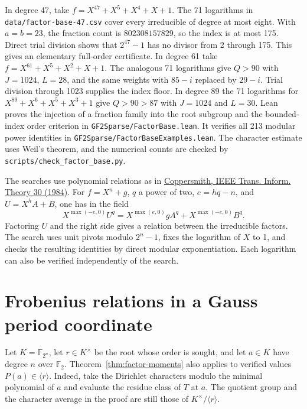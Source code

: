 \documentclass[11pt]{article}
\newcommand{\F}{\mathbb F_2}
\begin{document}
In degree 47, take \(f=X^{47}+X^5+X^4+X+1\).
The 71 logarithms in \nolinkurl{data/factor-base-47.csv} cover every
irreducible of degree at most eight. With \(a=b=23\), the fraction
count is \(802308157829\), so the index is at most 175.
Direct trial division shows that \(2^{47}-1\) has no divisor from 2
through 175. This gives an elementary full-order certificate. In degree
61 take \(f=X^{61}+X^5+X^2+X+1\). The analogous 71 logarithms give
\(Q>90\) with \(J=1024\), \(L=28\), and the same weights with
\(85-i\) replaced by \(29-i\). Trial division through 1023 supplies
the index floor. In degree 89 the 71 logarithms for
\(X^{89}+X^6+X^5+X^3+1\) give \(Q>90>87\) with \(J=1024\)
and \(L=30\). Lean proves the injection of a fraction family into
the root subgroup and the bounded-index order criterion in
\nolinkurl{GF2Sparse/FactorBase.lean}. It verifies all 213 modular
power identities in \nolinkurl{GF2Sparse/FactorBaseExamples.lean}.
The character estimate uses Weil's theorem, and the numerical counts
are checked by
\nolinkurl{scripts/check_factor_base.py}.

The searches use polynomial relations as in
\href{https://research.ibm.com/publications/fast-evaluation-of-logarithms-in-fields-of-characteristic-two}{Coppersmith, IEEE Trans. Inform. Theory 30 (1984)}.
For \(f=X^n+g\), \(q\) a power of two, \(e=hq-n\), and \(U=X^h A+B\),
one has in the field
\[
   X^{\max(-e,0)} U^q=X^{\max(e,0)}g A^q+X^{\max(-e,0)}B^q .
\]
Factoring \(U\) and the right side gives a relation between the
irreducible factors. The search uses unit pivots modulo \(2^n-1\),
fixes the logarithm of \(X\) to 1, and checks the resulting identities
by direct modular exponentiation. Each logarithm can also be verified
independently of the search.


\section{Frobenius relations in a Gauss period coordinate}\label{sec:period-logs}

Let \(K=\mathbb F_{2^n}\), let \(r\in K^\times\) be the root whose
order is sought, and let \(a\in K\) have degree \(n\) over \(\F\).
Theorem~\ref{thm:factor-moments} also applies to verified values
\(P(a)\in\langle r\rangle\). Indeed, take the Dirichlet characters
modulo the minimal polynomial of \(a\) and evaluate the residue class
of \(T\) at \(a\). The quotient group and the character average in the
proof are still those of \(K^\times/\langle r\rangle\).
\end{document}
